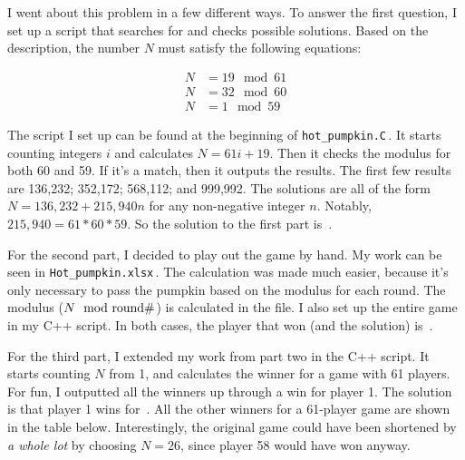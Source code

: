 \documentclass{article}
\begin{document}
I went about this problem in a few different ways.
To answer the first question, I set up a script that searches for and checks possible solutions.
Based on the description, the number $N$ must satisfy the following equations:

\begin{align*}
N&=19 \mod 61 \\
N&=32 \mod 60 \\
N&=1 \mod 59
\end{align*}

The script I set up can be found at the beginning of \texttt{hot\_pumpkin.C}\,.
It starts counting integers $i$ and calculates $N=61i+19$.
Then it checks the modulus for both 60 and 59.
If it's a match, then it outputs the results.
The first few results are 136,232; 352,172; 568,112; and 999,992.
The solutions are all of the form $N=136,232+215,940n$ for any non-negative integer $n$.
Notably, $215,940=61*60*59$.
So the solution to the first part is
\,.

For the second part, I decided to play out the game by hand.
My work can be seen in \texttt{Hot\_pumpkin.xlsx}\,.
The calculation was made much easier, because it's only necessary to pass the pumpkin based on the modulus for each round.
The modulus ($N\mod\rm{round \#}$) is calculated in the file.
I also set up the entire game in my C++ script.
In both cases, the player that won (and the solution) is
\,.

For the third part, I extended my work from part two in the C++ script.
It starts counting $N$ from 1, and calculates the winner for a game with 61 players.
For fun, I outputted all the winners up through a win for player 1.
The solution is that player 1 wins for
\,.
All the other winners for a 61-player game are shown in the table below.
Interestingly, the original game could have been shortened by \textit{a whole lot} by choosing $N=26$, since player 58 would have won anyway.
\end{document}

